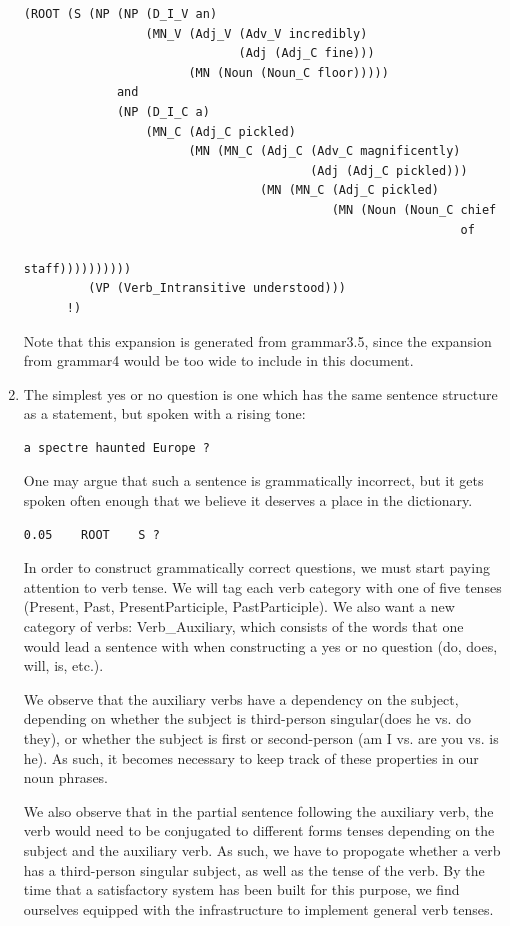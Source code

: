 \documentclass[11pt]{article}
\begin{document}
\begin{enumerate}
\begin{verbatim}
(ROOT (S (NP (NP (D_I_V an)
                 (MN_V (Adj_V (Adv_V incredibly)
                              (Adj (Adj_C fine)))
                       (MN (Noun (Noun_C floor)))))
             and
             (NP (D_I_C a)
                 (MN_C (Adj_C pickled)
                       (MN (MN_C (Adj_C (Adv_C magnificently)
                                        (Adj (Adj_C pickled)))
                                 (MN (MN_C (Adj_C pickled)
                                           (MN (Noun (Noun_C chief
                                                             of
                                                             staff))))))))))
         (VP (Verb_Intransitive understood)))
      !)
\end{verbatim}

      Note that this expansion is generated from grammar3.5, since the expansion from grammar4 would be too wide to include in this document.

      \item The simplest yes or no question is one which has the same sentence structure as a statement, but spoken with a rising tone:
      
\begin{verbatim}
a spectre haunted Europe ?
\end{verbatim}

      One may argue that such a sentence is grammatically incorrect, but it gets spoken often enough that we believe it deserves a place in the dictionary.

\begin{verbatim}
0.05    ROOT    S ?
\end{verbatim}

      In order to construct grammatically correct questions, we must start paying attention to verb tense. We will tag each verb category with one of five tenses (Present, Past, PresentParticiple, PastParticiple). We also want a new category of verbs: Verb\_Auxiliary, which consists of the words that one would lead a sentence with when constructing a yes or no question (do, does, will, is, etc.).

      We observe that the auxiliary verbs have a dependency on the subject, depending on whether the subject is third-person singular(does he vs. do they), or whether the subject is first or second-person (am I vs. are you vs. is he). As such, it becomes necessary to keep track of these properties in our noun phrases.

      We also observe that in the partial sentence following the auxiliary verb, the verb would need to be conjugated to different forms tenses depending on the subject and the auxiliary verb. As such, we have to propogate whether a verb has a third-person singular subject, as well as the tense of the verb. By the time that a satisfactory system has been built for this purpose, we find ourselves equipped with the infrastructure to implement general verb tenses.


\end{enumerate}
\end{document}
